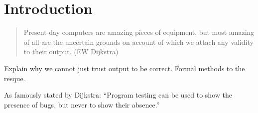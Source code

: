 \setcounter{section}{0}
\section{Introduction}\label{sec:introduction}


\begin{quote}
Present-day computers are amazing pieces of equipment, but most amazing of all
are the uncertain grounds on account of which we attach any validity to their
output.  \hfill  (EW Dijkstra)
\end{quote}

Explain why we cannot just trust output to be correct.
Formal methods to the resque.

As famously stated by Dijkstra: ``Program testing can be used to show the presence of bugs, but never to show their absence.''  \cite{dijkstra1970}









